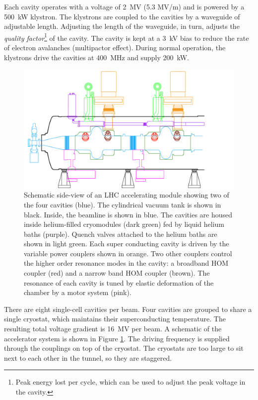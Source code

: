Each cavity operates with a voltage of 2~MV (5.3 MV/m) and is powered by a 500~kW klystron.
The klystrons are coupled to the cavities by a waveguide of adjustable length.
Adjusting the length of the waveguide, in turn, adjusts the \emph{quality factor}\footnote{Peak energy lost per cycle, which can be used to adjust the peak voltage in the cavity.} of the cavity.
The cavity is kept at a 3~kV bias to reduce the rate of electron avalanches (multipactor effect).
During normal operation, the klystrons drive the cavities at 400~MHz and supply 200~kW.

\begin{figure}[h!]
\captionsetup[subfigure]{position=b}
\centering
    \includegraphics[width=1\textwidth]{figures/experiment/rfproto.pdf}
\caption{Schematic side-view of an LHC accelerating module showing two of the four cavities (blue). The cylindrical vacuum tank is shown in black. Inside, the beamline is shown in blue. The cavities are housed inside helium-filled cryomodules (dark green) fed by liquid helium baths (purple). Quench valves attached to the helium baths are shown in light green. Each super conducting cavity is driven by the variable power couplers shown in orange. Two other couplers control the higher order resonance modes in the cavity: a broadband HOM coupler (red) and a narrow band HOM coupler (brown). The resonance of each cavity is tuned by elastic deformation of the chamber by a motor system (pink).}
\label{fig:cavities}
\end{figure}

There are eight single-cell cavities per beam.
Four cavities are grouped to share a single cryostat, which maintains their superconducting temperature.
The resulting total voltage gradient is 16~MV per beam.
A schematic of the accelerator system is shown in Figure \ref{fig:cavities}.
The driving frequency is supplied through the couplings on top of the cryostat.
The cryostats are too large to sit next to each other in the tunnel, so they are staggered.

